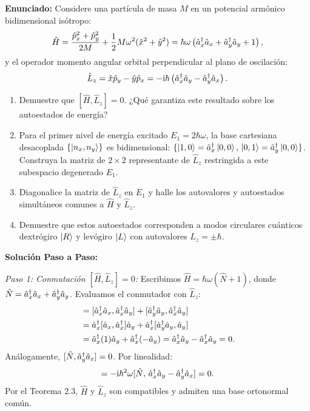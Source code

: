 \begin{ejemplobox}
    \textbf{Enunciado:} Considere una partícula de masa $M$ en un potencial armónico bidimensional isótropo:
    \begin{equation}
        \hat{H} = \frac{\hat{p}_x^2 + \hat{p}_y^2}{2M} + \frac{1}{2}M\omega^2(\hat{x}^2 + \hat{y}^2) = \hbar\omega\left( \hat{a}_x^\dagger\hat{a}_x + \hat{a}_y^\dagger\hat{a}_y + 1 \right),
    \end{equation}
    y el operador momento angular orbital perpendicular al plano de oscilación:
    \begin{equation}
        \hat{L}_z = \hat{x}\hat{p}_y - \hat{y}\hat{p}_x = -\mathrm{i}\hbar\left(\hat{a}_x^\dagger\hat{a}_y - \hat{a}_y^\dagger\hat{a}_x\right).
    \end{equation}
    \begin{enumerate}
        \item Demuestre que $[\hat{H}, \hat{L}_z] = 0$. ¿Qué garantiza este resultado sobre los autoestados de energía?
        \item Para el primer nivel de energía excitado $E_1 = 2\hbar\omega$, la base cartesiana desacoplada $\{\left| n_x, n_y \right\rangle\}$ es bidimensional: $\{\left| 1, 0 \right\rangle = \hat{a}_x^\dagger\left| 0, 0 \right\rangle, \, \left| 0, 1 \right\rangle = \hat{a}_y^\dagger\left| 0, 0 \right\rangle\}$. Construya la matriz de $2\times 2$ representante de $\hat{L}_z$ restringida a este subespacio degenerado $E_1$.
        \item Diagonalice la matriz de $\hat{L}_z$ en $E_1$ y halle los autovalores y autoestados simultáneos comunes a $\hat{H}$ y $\hat{L}_z$.
        \item Demuestre que estos autoestados corresponden a modos circulares cuánticos dextrógiro $\left| R \right\rangle$ y levógiro $\left| L \right\rangle$ con autovalores $L_z = \pm\hbar$.
    \end{enumerate}

    \textbf{Solución Paso a Paso:}

    \textit{Paso 1: Conmutación $[\hat{H}, \hat{L}_z] = 0$:}
    Escribimos $\hat{H} = \hbar\omega(\hat{N} + 1)$, donde $\hat{N} = \hat{a}_x^\dagger\hat{a}_x + \hat{a}_y^\dagger\hat{a}_y$. Evaluamos el conmutador con $\hat{L}_z$:
    \begin{align}
        [\hat{N}, \hat{a}_x\adj\hat{a}_y] &= [\hat{a}_x\adj\hat{a}_x, \hat{a}_x\adj\hat{a}_y] + [\hat{a}_y\adj\hat{a}_y, \hat{a}_x\adj\hat{a}_y] \nonumber\\
        &= \hat{a}_x\adj[\hat{a}_x, \hat{a}_x\adj]\hat{a}_y + \hat{a}_x\adj[\hat{a}_y\adj\hat{a}_y, \hat{a}_y] \nonumber\\
        &= \hat{a}_x\adj(1)\hat{a}_y + \hat{a}_x\adj(-\hat{a}_y) = \hat{a}_x\adj\hat{a}_y - \hat{a}_x\adj\hat{a}_y = 0.
    \end{align}
    Análogamente, $[\hat{N}, \hat{a}_y^\dagger\hat{a}_x] = 0$. Por linealidad:
    \begin{equation}
        [\hat{H}, \hat{L}_z] = -\iu\hbar^2\omega [\hat{N}, \, \hat{a}_x\adj\hat{a}_y - \hat{a}_y\adj\hat{a}_x] = 0.
    \end{equation}
    Por el Teorema 2.3, $\hat{H}$ y $\hat{L}_z$ son compatibles y admiten una base ortonormal común.


\end{ejemplobox}
